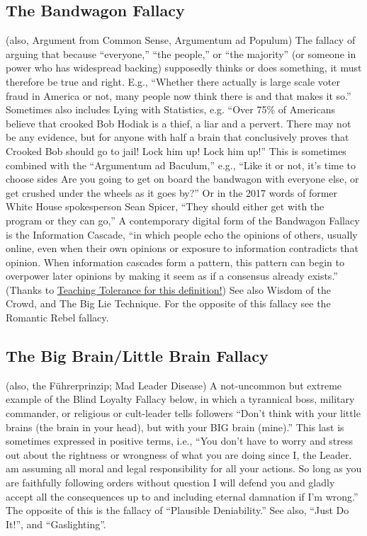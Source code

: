 \documentclass[10pt,a4paper,british]{article}
\begin{document}
\begin{multicols}{2}
	\subsection{The Bandwagon Fallacy} (also, Argument from Common Sense,
	Argumentum ad Populum) The fallacy of arguing that because ``everyone,''
	``the people,'' or ``the majority'' (or someone in power who has widespread
	backing) supposedly thinks or does something, it must therefore be true and
	right. E.g., ``Whether there actually is large scale voter fraud in America
	or not, many people now think there is and that makes it so.'' Sometimes
	also includes Lying with Statistics, e.g. “Over 75\% of Americans believe
	that crooked Bob Hodiak is a thief, a liar and a pervert. There may not be
	any evidence, but for anyone with half a brain that conclusively proves
	that Crooked Bob should go to jail! Lock him up! Lock him up!” This is
	sometimes combined with the ``Argumentum ad Baculum,'' e.g., ``Like it or
	not, it's time to choose sides Are you going to get on board  the bandwagon
	with everyone else, or get crushed under the wheels as it goes by?'' Or in
	the 2017 words of former White House spokesperson Sean Spicer, ``They
	should either get with the program or they can go,'' A contemporary digital
	form of the Bandwagon Fallacy is the Information Cascade, ``in which people
	echo the opinions of others, usually online, even when their own opinions
	or exposure to information contradicts that opinion. When information
	cascades form a pattern, this pattern can begin to overpower later opinions
	by making it seem as if a consensus already exists.'' (Thanks to
	\href{https://www.tolerance.org/magazine/fall-2017/speaking-of-digital-literacy}{Teaching
	Tolerance for this definition!}) See also Wisdom of the Crowd, and The Big
	Lie Technique. For the opposite of this fallacy see the Romantic Rebel
	fallacy. 

	\subsection{The Big Brain/Little Brain Fallacy} (also, the Führerprinzip;
	Mad Leader Disease) A not{-}uncommon but extreme example of the Blind
	Loyalty Fallacy below, in which a tyrannical boss, military commander, or
	religious or cult{-}leader tells followers ``Don't think with your little
	brains (the brain in your head), but with your BIG brain (mine).'' This
	last is sometimes expressed in positive terms, i.e., ``You don't have to
	worry and stress out about the rightness or wrongness of what you are doing
	since I, the Leader. am assuming all moral and legal responsibility for all
	your actions. So long as you are faithfully following orders without
	question I will defend you and gladly accept all the consequences up to and
	including eternal damnation if I'm wrong.'' The opposite of this is the
	fallacy of ``Plausible Deniability.'' See also, ``Just Do It!'', and
	``Gaslighting''.


\end{multicols}
\end{document}
